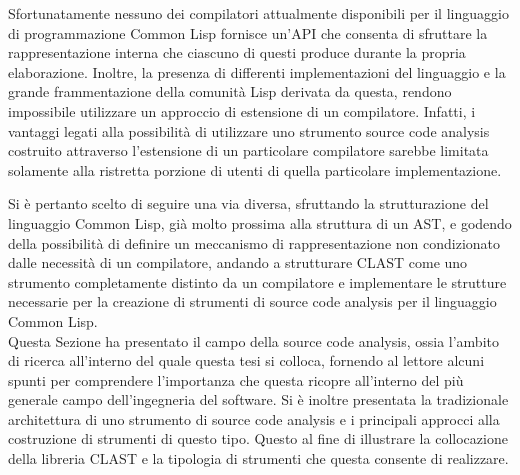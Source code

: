 Sfortunatamente nessuno dei compilatori attualmente disponibili per il
linguaggio di programmazione Common Lisp fornisce un'API che consenta di
sfruttare la rappresentazione interna che ciascuno di questi produce durante la
propria elaborazione. Inoltre, la presenza di differenti implementazioni del
linguaggio e la grande frammentazione della comunità Lisp derivata da questa,
rendono impossibile utilizzare un approccio di estensione di un compilatore.
Infatti, i vantaggi legati alla possibilità di utilizzare uno strumento source
code analysis costruito attraverso l'estensione di un particolare compilatore
sarebbe limitata solamente alla ristretta porzione di utenti di quella
particolare implementazione.

Si è pertanto scelto di seguire una via diversa, sfruttando la strutturazione
del linguaggio Common Lisp, già molto prossima alla struttura di un AST, e
godendo della possibilità di definire un meccanismo di rappresentazione non
condizionato dalle necessità di un compilatore, andando a strutturare CLAST
come uno strumento completamente distinto da un compilatore e implementare le
strutture necessarie per la creazione di strumenti di source code analysis per
il linguaggio Common Lisp.\\

Questa Sezione ha presentato il campo della source code analysis, ossia l'ambito
di ricerca all'interno del quale questa tesi si colloca, fornendo al lettore
alcuni spunti per comprendere l'importanza che questa ricopre all'interno del
più generale campo dell'ingegneria del software. Si è inoltre presentata la
tradizionale architettura di uno strumento di source code analysis e i
principali approcci alla costruzione di strumenti di questo tipo. Questo al fine
di illustrare la collocazione della libreria CLAST e la tipologia di strumenti
che questa consente di realizzare.





